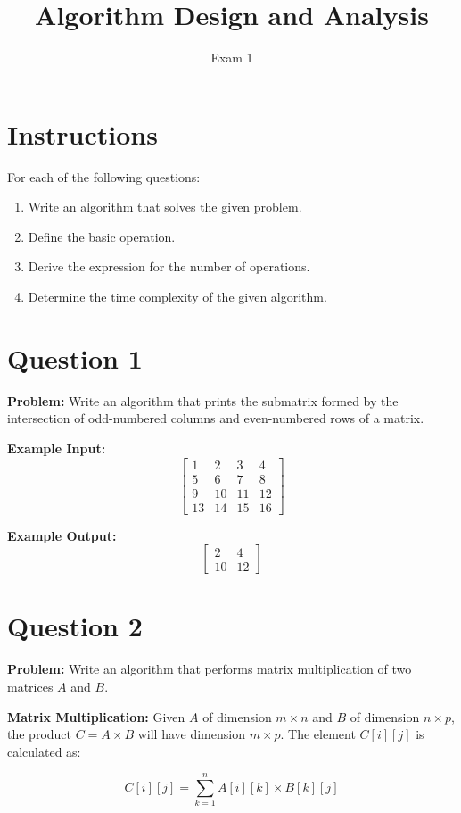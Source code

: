 \documentclass[12pt]{article}
\title{\vspace{-2cm} Algorithm Design and Analysis}
\author{Exam 1}
\date{}
\begin{document}
\maketitle

\section*{Instructions}
For each of the following questions:
\begin{enumerate}[noitemsep] 
    \item Write an algorithm that solves the given problem.
    \item Define the basic operation.
    \item Derive the expression for the number of operations.
    \item Determine the time complexity of the given algorithm.  
\end{enumerate}

\section*{Question 1}
\textbf{Problem:} Write an algorithm that prints the submatrix formed by the intersection of odd-numbered columns and even-numbered rows of a matrix.

\textbf{Example Input:}
\[
\begin{bmatrix}
1 & 2 & 3 & 4 \\
5 & 6 & 7 & 8 \\
9 & 10 & 11 & 12 \\
13 & 14 & 15 & 16
\end{bmatrix}
\]

\textbf{Example Output:}
\[
\begin{bmatrix}
2 & 4 \\
10 & 12
\end{bmatrix}
\]


\section*{Question 2}
\textbf{Problem:} Write an algorithm that performs matrix multiplication of two matrices \(A\) and \(B\).

\textbf{Matrix Multiplication:} Given \(A\) of dimension \(m \times n\) and \(B\) of dimension \(n \times p\), the product \(C = A \times B\) will have dimension \(m \times p\). The element \(C[i][j]\) is calculated as:

\[
C[i][j] = \sum_{k=1}^{n} A[i][k] \times B[k][j]
\]
\end{document}
